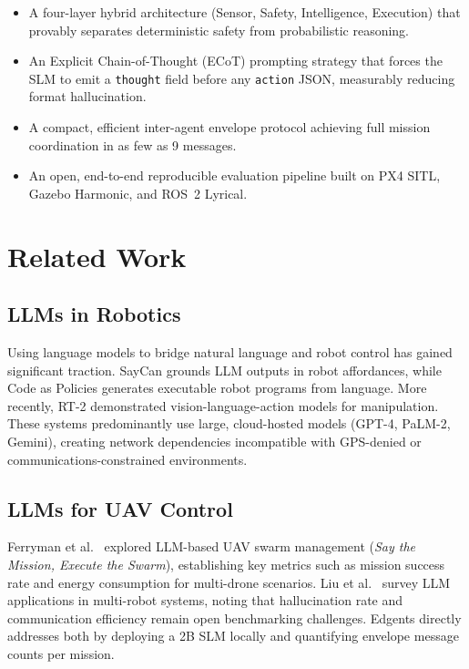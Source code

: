 \documentclass[conference]{IEEEtran}
\begin{document}
\begin{itemize}
    \item A four-layer hybrid architecture (Sensor, Safety, Intelligence, Execution) that provably separates deterministic safety from probabilistic reasoning.
    \item An Explicit Chain-of-Thought (ECoT) prompting strategy that forces the SLM to emit a \texttt{thought} field before any \texttt{action} JSON, measurably reducing format hallucination.
    \item A compact, efficient inter-agent envelope protocol achieving full mission coordination in as few as 9 messages.
    \item An open, end-to-end reproducible evaluation pipeline built on PX4 SITL, Gazebo Harmonic, and ROS~2 Lyrical.
\end{itemize}

\section{Related Work}
\label{sec:related}

\subsection{LLMs in Robotics}

Using language models to bridge natural language and robot control has gained significant traction. SayCan \cite{ref_saycan} grounds LLM outputs in robot affordances, while Code as Policies \cite{ref_cap} generates executable robot programs from language. More recently, RT-2 \cite{ref_rt2} demonstrated vision-language-action models for manipulation. These systems predominantly use large, cloud-hosted models (GPT-4, PaLM-2, Gemini), creating network dependencies incompatible with GPS-denied or communications-constrained environments.

\subsection{LLMs for UAV Control}

Ferryman et al.~\cite{ref_say_mission} explored LLM-based UAV swarm management (\emph{Say the Mission, Execute the Swarm}), establishing key metrics such as mission success rate and energy consumption for multi-drone scenarios. Liu et al.~\cite{ref_llm_uav_survey} survey LLM applications in multi-robot systems, noting that hallucination rate and communication efficiency remain open benchmarking challenges. Edgents directly addresses both by deploying a 2B SLM locally and quantifying envelope message counts per mission.
\end{document}
